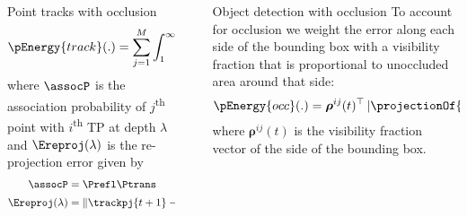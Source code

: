 \documentclass[final]{beamer}
\newlength{\sepwid}
\newlength{\onecolwid}
\begin{document}
\begin{frame}[t]
\begin{columns}[t]
\begin{column}{\onecolwid}
\begin{block}{Point tracks with occlusion}
        \begin{align}
          \pEnergy{track}(.) =
          \sum_{j = 1}^{M}
          \int_1^\infty \assocP\Ereproj(\lambda) d\lambda
        \end{align}
        where $\assocP$ is the association probability of
        $j$\textsuperscript{th} point with $i$\textsuperscript{th} TP at depth $\lambda$
        and $\Ereproj(\lambda)$ is the re-projection error given by
        \begin{align}
          \assocP &= \Prefl\Ptrans\\
          \Ereproj(\lambda) &= \left\|\trackpj{t+1} - \projectionOft{\invProjectionOf{\trackpj{t}, \lambda}}\right\|^2 .
          \label{eq:reprojerror}
        \end{align}

      \end{block}

    \end{column}

  \begin{column}{\sepwid}\end{column}			%

    \begin{column}{\onecolwid}

      \begin{block}{Object detection with occlusion}
        To account for occlusion we weight the error along each side of the
        bounding box with a visibility fraction that is proportional to
        unoccluded area around that side:
        \begin{align}
          \pEnergy{occ}(.) =
          \bm{\rho}^{ij}(t)^\top\left|\projectionOf{\dimsn{i}} - \bb{i}\right|
          \enspace,
        \end{align}
        where $\bm{\rho}^{ij}(t)$ is the visibility fraction vector of the side
        of the bounding box.
        
      \end{block}



\end{column}
\end{columns}
\end{frame}
\end{document}
